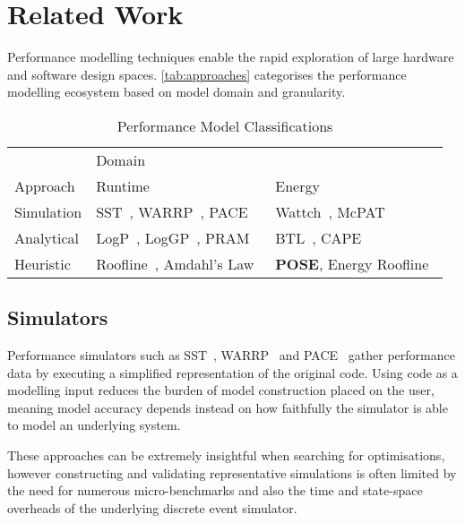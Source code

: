 \section{Related Work}
\label{sec:related}
\noindent
Performance modelling techniques enable the rapid exploration of large hardware and software design spaces.
\autoref{tab:approaches} categorises the performance modelling ecosystem based on model domain and granularity.

\begin{table}
  \centering
  \scriptsize
  \setlength{\tabcolsep}{.7em} 
  \caption{Performance Model Classifications}
  \begin{tabular}{lll}
  \toprule
    & \multicolumn{2}{l}{Domain}\\ \cmidrule(){2-3}
    Approach & Runtime & Energy \\
    \midrule
  Simulation & SST~\cite{rodrigues:2011aa}, WARRP~\cite{hammond:2009aa}, PACE~\cite{cao:2000aa} & Wattch~\cite{brooks:2000aa}, McPAT~\cite{li:2009aa}  \\
  Analytical & LogP~\cite{culler:1993aa}, LogGP~\cite{alexandrov:1997aa}, PRAM~\cite{karp:1991aa}  & BTL~\cite{manousakis:2012aa}, CAPE~\cite{kamble:1997aa} \\
  Heuristic & Roofline~\cite{williams:2009aa}, Amdahl's Law~\cite{amdahl:1967aa} & \textbf{POSE}, Energy Roofline~\cite{choi:2013aa} \\
  \bottomrule
  \end{tabular}
  \label{tab:approaches}
\end{table}

\noindent
\subsection{Simulators} 
\noindent
Performance simulators such as SST~\cite{rodrigues:2011aa}, WARRP~\cite{hammond:2009aa} and PACE~\cite{cao:2000aa} gather performance data by executing a simplified representation of the original code.
Using code as a modelling input reduces the burden of model construction placed on the user, meaning model accuracy depends instead on how faithfully the simulator is able to model an underlying system.

These approaches can be extremely insightful when searching for optimisations, however constructing and validating representative simulations is often limited by the need for numerous micro-benchmarks and also the time and state-space overheads of the underlying discrete event simulator.

